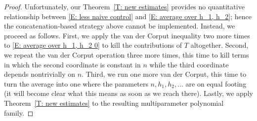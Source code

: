 \documentclass[11pt]{amsart}
\theoremstyle{definition}
\newcommand{\1}{{\mathbf{1}}}
\begin{document}
\begin{proof}
    Unfortunately, our Theorem~\ref{T: new estimates} provides no quantitative relationship between \eqref{E: less naive control} and \eqref{E: average over h_1, h_2}; hence the concatenation-based strategy above cannot be implemented. Instead, we proceed as follows. First, we apply the van der Corput inequality two more times to \eqref{E: average over h_1, h_2 0} to kill the contributions of $T$ altogether. Second, we repeat the van der Corput operation three more times, this time to kill terms in which the second coordinate is constant in $n$ while the third coordinate depends nontrivially on $n$. Third, we run one more van der Corput, this time to turn the average into one where the parameters $n, h_1, h_2,\ldots$ are on equal footing (it will become clear what this means as soon as we reach there). Lastly, we apply Theorem~\ref{T: new estimates} to the resulting multiparameter polynomial family. 
    

\end{proof}
\end{document}
